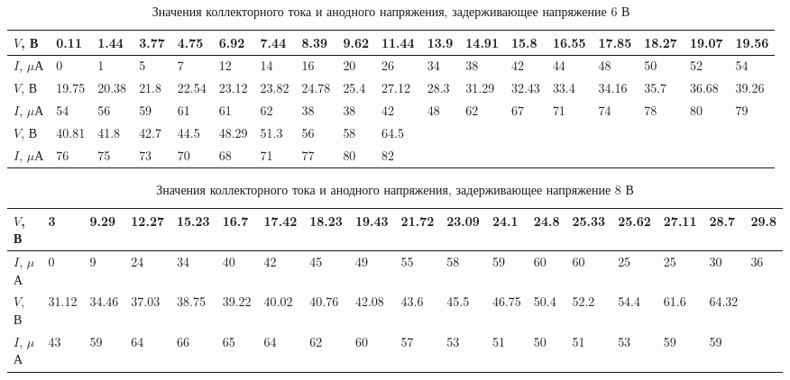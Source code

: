 \documentclass[a4paper]{article}
\begin{document}
\begin{enumerate}
    \begin{table}[h]
    \centering
    \begin{center}
    \caption{Значения коллекторного тока и анодного напряжения, задерживающее напряжение 6 В}
    \end{center}
    \vspace{0.1cm}
    \label{tab:my_label}
    \begin{tabular}{ |p{1cm}||p{0.6cm}|p{0.6cm}|p{0.6cm}|p{0.6cm}|p{0.6cm}|p{0.6cm}|p{0.6cm}|p{0.6cm}|p{0.6cm}|p{0.6cm}|p{0.6cm}|p{0.6cm}|p{0.6cm}|p{0.6cm}|p{0.6cm}|p{0.6cm}|p{0.6cm}|}
 \hline
$V$, В & 0.11 & 1.44 & 3.77 & 4.75 & 6.92 & 7.44 & 8.39 & 9.62 & 11.44 & 13.9 & 14.91 & 15.8 & 16.55 & 17.85 & 18.27 & 19.07 & 19.56\\
 \hline
 $I$, $\mu$А & 0 & 1 & 5 & 7 & 12 & 14 & 16 & 20 & 26 & 34 & 38 & 42 & 44 & 48 & 50 & 52 & 54\\
\hline
\hline
$V$, В & 19.75 & 20.38 & 21.8 & 22.54 & 23.12 & 23.82 & 24.78 & 25.4 & 27.12 & 28.3 & 31.29 & 32.43 & 33.4 & 34.16 & 35.7 & 36.68 & 39.26\\
\hline
$I$, $\mu$А & 54 & 56 & 59 & 61 & 61 & 62 & 38 & 38 & 42 & 48 & 62 & 67 & 71 & 74 & 78 & 80 & 79\\
\hline
\hline
$V$, В & 40.81 & 41.8 & 42.7 & 44.5 & 48.29 & 51.3 & 56 & 58 & 64.5 &  &  &  &  &  &  &  & \\
\hline
$I$, $\mu$А & 76 & 75 & 73 & 70 & 68 & 71 & 77 & 80 & 82 &  &  &  &  &  &  &  & \\
\hline
 
\end{tabular}
\end{table}

    \begin{table}[h]
    \centering
    \begin{center}
    \caption{Значения коллекторного тока и анодного напряжения, задерживающее напряжение 8 В}
    \end{center}
    \vspace{0.1cm}
    \label{tab:my_label}
    \begin{tabular}{ |p{1cm}||p{0.6cm}|p{0.6cm}|p{0.6cm}|p{0.6cm}|p{0.6cm}|p{0.6cm}|p{0.6cm}|p{0.6cm}|p{0.6cm}|p{0.6cm}|p{0.6cm}|p{0.6cm}|p{0.6cm}|p{0.6cm}|p{0.6cm}|p{0.6cm}|p{0.6cm}|}
 \hline
$V$, В & 3 & 9.29 & 12.27 & 15.23 & 16.7 & 17.42 & 18.23 & 19.43 & 21.72 & 23.09 & 24.1 & 24.8 & 25.33 & 25.62 & 27.11 & 28.7 & 29.8\\
 \hline
 $I$, $\mu$А & 0 & 9 & 24 & 34 & 40 & 42 & 45 & 49 & 55 & 58 & 59 & 60 & 60 & 25 & 25 & 30 & 36\\
\hline
\hline
$V$, В & 31.12 & 34.46 & 37.03 & 38.75 & 39.22 & 40.02 & 40.76 & 42.08 & 43.6 & 45.5 & 46.75 & 50.4 & 52.2 & 54.4 & 61.6 & 64.32 & \\
\hline
$I$, $\mu$А & 43 & 59 & 64 & 66 & 65 & 64 & 62 & 60 & 57 & 53 & 51 & 50 & 51 & 53 & 59 & 59 & \\
\hline
 

\end{tabular}
\end{table}
\end{enumerate}
\end{document}
